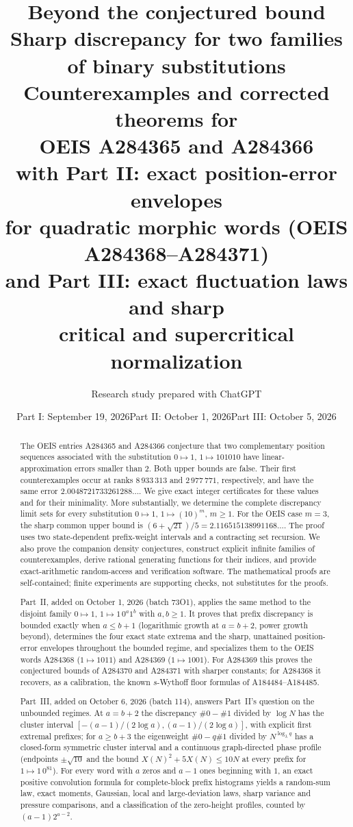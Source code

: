 \documentclass[11pt]{article}
\title{\color{ink}\LARGE Beyond the conjectured bound\\[5pt]
\Large Sharp discrepancy for two families\\of binary substitutions\\[9pt]
\large Counterexamples and corrected theorems for\\OEIS A284365 and A284366\\[4pt]
\normalsize with Part II: exact position-error envelopes\\for quadratic morphic words (OEIS A284368--A284371)\\[3pt]
and Part III: exact fluctuation laws and sharp\\critical and supercritical normalization}
\author{Research study prepared with ChatGPT}
\date{Part I: September 19, 2026\quad Part II: October 1, 2026\quad Part III: October 5, 2026}
\numberwithin{equation}{section}
\theoremstyle{definition}
\theoremstyle{remark}
\begin{document}
\maketitle
\thispagestyle{empty}
\begin{abstract}
The OEIS entries A284365 and A284366 conjecture that two complementary
position sequences associated with the substitution $0\mapsto1$,
$1\mapsto101010$ have linear-approximation errors smaller than $2$.
Both upper bounds are false. Their first counterexamples occur at ranks
$8\,933\,313$ and $2\,977\,771$, respectively, and have the same error
$2.0048721733261288\ldots$. We give exact integer certificates for these
values and for their minimality. More substantially, we determine the
complete discrepancy limit sets for every substitution
$0\mapsto1$, $1\mapsto(10)^m$, $m\ge1$. For the OEIS case $m=3$, the sharp
common upper bound is $(6+\sqrt{21})/5=2.116515138991168\ldots$.
The proof uses two state-dependent prefix-weight intervals and a contracting
set recursion. We also prove the companion density conjectures, construct
explicit infinite families of counterexamples, derive rational generating
functions for their indices, and provide exact-arithmetic random-access
and verification software. The mathematical proofs are self-contained;
finite experiments are supporting checks, not substitutes for the proofs.

Part~II, added on October 1, 2026 (batch 73O1), applies the same method to
the disjoint family $0\mapsto1$, $1\mapsto1\,0^a1^b$ with $a,b\ge1$. It
proves that prefix discrepancy is bounded exactly when $a\le b+1$
(logarithmic growth at $a=b+2$, power growth beyond), determines the four
exact state extrema and the sharp, unattained position-error envelopes
throughout the bounded regime, and specializes them to the OEIS words
A284368 ($1\mapsto1011$) and A284369 ($1\mapsto1001$). For A284369 this
proves the conjectured bounds of A284370 and A284371 with sharper constants;
for A284368 it recovers, as a calibration, the known $s$-Wythoff floor
formulas of A184484--A184485.

Part~III, added on October 6, 2026 (batch 114), answers Part~II's question
on the unbounded regimes. At $a=b+2$ the discrepancy $\#0-\#1$ divided by
$\log N$ has the cluster interval $[-(a-1)/(2\log a),(a-1)/(2\log a)]$, with
explicit first extremal prefixes; for $a\geq b+3$ the eigenweight
$\#0-q\#1$ divided by $N^{\log_\lambda q}$ has a closed-form symmetric
cluster interval and a continuous graph-directed phase profile (endpoints
$\pm\sqrt{10}$ and the bound $X(N)^2+5X(N)\leq10N$ at every prefix for
$1\mapsto1\,0^81$). For every word with $a$ zeros and $a-1$ ones beginning
with $1$, an exact positive convolution formula for complete-block prefix
histograms yields a random-sum law, exact moments, Gaussian, local and
large-deviation laws, sharp variance and pressure comparisons, and a
classification of the zero-height profiles, counted by $(a-1)2^{a-2}$.
\end{abstract}
\end{document}
